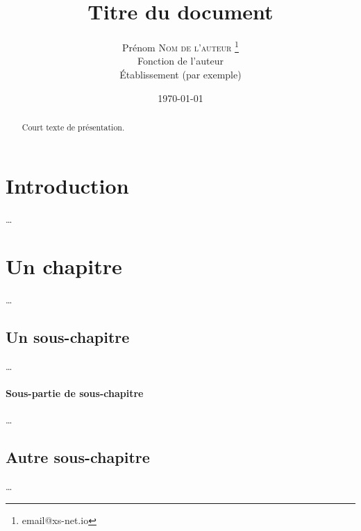 \documentclass[frenchb, 12pt, twoside, a4paper]{article}
\title{Titre du document}
\author{Prénom \textsc{Nom de l'auteur} \thanks{email@xs-net.io} \\
Fonction de l'auteur \\
Établissement (par exemple)}
\date{\today}                           %
\begin{document}
\maketitle                              %

{
\renewcommand{\contentsname}{Sommaire}  %
\tableofcontents                        %
}


\begin{abstract}
Court texte de présentation.
\end{abstract}

\clearpage\setcounter{page}{2}


\section*{Introduction}

…

\section{Un chapitre}
…

\subsection{Un sous-chapitre}
…
\paragraph{Sous-partie de sous-chapitre}
…

\subsection{Autre sous-chapitre}
…

%
\end{document}
